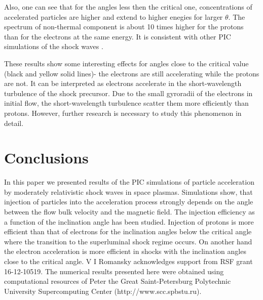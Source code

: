 \documentclass[a4paper]{jpconf}
\begin{document}
Also, one can see that for the angles less then the critical one, concentrations of accelerated particles are higher and extend to higher enegies for larger $\theta$. The spectrum of non-thermal component is about 10 times higher for the protons than for the electrons at the same energy. It is consistent with other PIC simulations of the shock waves {\cite{Sironi2011}}.

These results show some interesting effects for angles close to the critical value (black and yellow solid lines)- the electrons are still accelerating while the protons are not. It can be interpreted as electrons accelerate in the short-wavelength turbulence of the shock precursor. Due to the small gyroradii of the electrons in initial flow, the short-wavelength turbulence scatter them more efficiently than protons. However, further research is necessary to study this phenomenon in detail.


\section{Conclusions}
In this paper we presented results of the PIC simulations of particle acceleration by moderately relativistic shock waves in space plasmas. Simulations show, that injection of particles into the acceleration process strongly depends on the angle between the flow bulk velocity and the magnetic field. The injection efficiency as a function of the inclination angle has been studied. Injection of protons is more efficient than that of electrons for the inclination angles below the critical angle where the transition to the superluminal shock regime occurs. On  another hand the electron acceleration is more efficient in shocks with the inclination angles close to the critical angle.
\ack
V I Romansky acknowledges support from RSF grant 16-12-10519.
The numerical results presented here were obtained using computational resources of Peter the Great Saint-Petersburg Polytechnic University Supercomputing Center (http://www.scc.spbstu.ru). 
\end{document}

